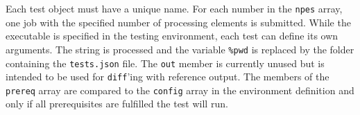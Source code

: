 Each \JSON test object must have a unique name. For each number in the \lstinline[style=SHELL]|npes| array, one job with the specified number of processing elements is submitted. While the executable is specified in the testing environment, each test can define its own arguments. The string is processed and the variable \lstinline[style=SHELL]|%pwd| is replaced by the folder containing the \lstinline[style=SHELL]|tests.json| file. The \lstinline[style=SHELL]|out| member is currently unused but is intended to be used for \lstinline[style=SHELL]|diff|'ing with reference output. The members of the \lstinline[style=SHELL]|prereq| array are compared to the \lstinline[style=SHELL]|config| array in the environment definition and only if all prerequisites are fulfilled the test will run.
